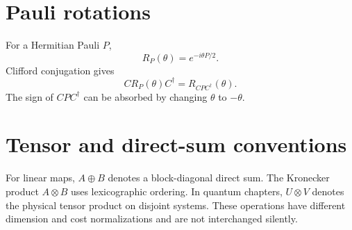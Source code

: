 \section{Pauli rotations}
For a Hermitian Pauli $P$,
\[
R_P(\theta)=e^{-i\theta P/2}.
\]
Clifford conjugation gives
\[
C R_P(\theta) C^\dagger=R_{CPC^\dagger}(\theta).
\]
The sign of $CPC^\dagger$ can be absorbed by changing $\theta$ to $-\theta$.

\section{Tensor and direct-sum conventions}
For linear maps, $A\oplus B$ denotes a block-diagonal direct sum.  The Kronecker product $A\otimes B$ uses lexicographic ordering.  In quantum chapters, $U\otimes V$ denotes the physical tensor product on disjoint systems.  These operations have different dimension and cost normalizations and are not interchanged silently.

